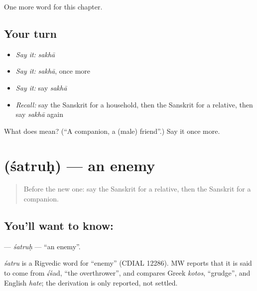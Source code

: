 \begin{grammarlens}[title={What you've built}]
One more word for this chapter.
\end{grammarlens}

\subsection*{Your turn}
\begin{itemize}
\raggedright
  \item \emph{Say it:} \emph{sakhā}
  \item \emph{Say it:} \emph{sakhā}, once more
  \item \emph{Say it:} say \emph{sakhā}
  \item \emph{Recall:} say the Sanskrit for a household, then the Sanskrit for a relative, then say \emph{sakhā} again
\end{itemize}

\begin{tcolorbox}[breakable,colback=teal!4,colframe=teal!35!black,title={Before you move on}]
What does  mean? (\textquotedblleft{}A companion, a (male) friend\textquotedblright{}.) Say it once more.
\end{tcolorbox}
\section[\texorpdfstring{\sk{शत्रुः} (śatruḥ)}{शत्रुः (śatruḥ)}]{ (śatruḥ) — an enemy}

\label{lesson:SA-C208-satruh}



\begin{quote}
Before the new one: say the Sanskrit for a relative, then the Sanskrit for a companion.
\end{quote}

\subsection*{You'll want to know: }
\textbf{} — \emph{śatruḥ} — \textquotedblleft{}an enemy\textquotedblright{}.

\begin{cousinweb}
\emph{śatru} is a Rigvedic word for \textquotedblleft{}enemy\textquotedblright{} (CDIAL 12286). MW reports that it is said to come from √śad, \textquotedblleft{}the overthrower\textquotedblright{}, and compares Greek \emph{kotos}, \textquotedblleft{}grudge\textquotedblright{}, and English \emph{hate}; the derivation is only reported, not settled.
\end{cousinweb}

